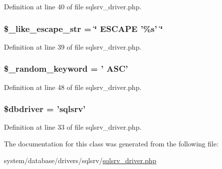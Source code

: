 Definition at line 40 of file sqlsrv\-\_\-driver.\-php.

\hypertarget{class_c_i___d_b__sqlsrv__driver_adf86ecadf3d0e1ce3f5e0eaeeb3867ae}{
\subsubsection[{\$\-\_\-like\-\_\-escape\-\_\-str}]{\setlength{\rightskip}{0pt plus 5cm}\$\-\_\-like\-\_\-escape\-\_\-str = \char`\"{} E\-S\-C\-A\-P\-E '\%s' \char`\"{}}}\label{class_c_i___d_b__sqlsrv__driver_adf86ecadf3d0e1ce3f5e0eaeeb3867ae}


Definition at line 39 of file sqlsrv\-\_\-driver.\-php.

\hypertarget{class_c_i___d_b__sqlsrv__driver_a10213aa6e05f6d924d3277bb1d2fea00}{
\subsubsection[{\$\-\_\-random\-\_\-keyword}]{\setlength{\rightskip}{0pt plus 5cm}\$\-\_\-random\-\_\-keyword = ' A\-S\-C'}}\label{class_c_i___d_b__sqlsrv__driver_a10213aa6e05f6d924d3277bb1d2fea00}


Definition at line 48 of file sqlsrv\-\_\-driver.\-php.

\hypertarget{class_c_i___d_b__sqlsrv__driver_a0cde2a16322a023d040aa7f725877597}{
\subsubsection[{\$dbdriver}]{\setlength{\rightskip}{0pt plus 5cm}\$dbdriver = 'sqlsrv'}}\label{class_c_i___d_b__sqlsrv__driver_a0cde2a16322a023d040aa7f725877597}


Definition at line 33 of file sqlsrv\-\_\-driver.\-php.



The documentation for this class was generated from the following file\-:\begin{DoxyCompactItemize}
\item 
system/database/drivers/sqlsrv/\hyperlink{sqlsrv__driver_8php}{sqlsrv\-\_\-driver.\-php}\end{DoxyCompactItemize}
